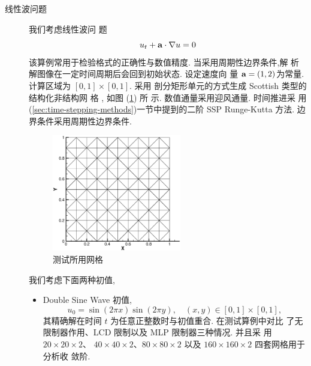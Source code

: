 \begin{description}
\item[线性波问题] 我们考虑线性波问
  题
  \begin{equation}
    \label{eq:linear-wave-problem-testcase}
    u_{t} + {\bf{a}} \cdot \nabla u = 0
  \end{equation}
  该算例常用于检验格式的正确性与数值精度. 当采用周期性边界条件,解
  析解图像在一定时间周期后会回到初始状态. 设定速度向
  量 ${\bf{a}}=(1,2)$为常量. 计算区域为 $[0,1] \times [0,1]$. 采用
  剖分矩形单元的方式生成 Scottish 类型的结构化非结构网
  格 \cite{Buffard2010}, 如图 (\ref{fig:structured-mesh-show}) 所
  示. 数值通量采用迎风通量. 时间推进采
  用 (\ref{sec:time-stepping-methods})一节中提到的二阶 SSP
  Runge-Kutta 方法. 边界条件采用周期性边界条件.
  \begin{figure}[htbp]
    \centering
    \includegraphics[height=2.0in]{./Pho/Chp3/mesh10X10.eps}
    \caption{测试所用网格}
    \label{fig:structured-mesh-show}
  \end{figure}
  我们考虑下面两种初值,
  \begin{itemize}
  \item Double Sine Wave 初值,
    \begin{equation}
      \label{eq:double-sine-wave}
      u_{0} = \sin(2\pi x) \sin (2\pi y), \quad (x,y) \in
      [0,1]\times [0,1],
    \end{equation}
    其精确解在时间 $t$ 为任意正整数时与初值重合. 在测试算例中对比
    了无限制器作用、LCD 限制以及 MLP 限制器三种情况. 并且采
    用$20\times 20 \times 2$、 $40\times 40 \times 2$、$80\times
    80 \times 2$ 以及 $160\times 160 \times 2$ 四套网格用于分析收
    敛阶.


\end{itemize}
\end{description}
